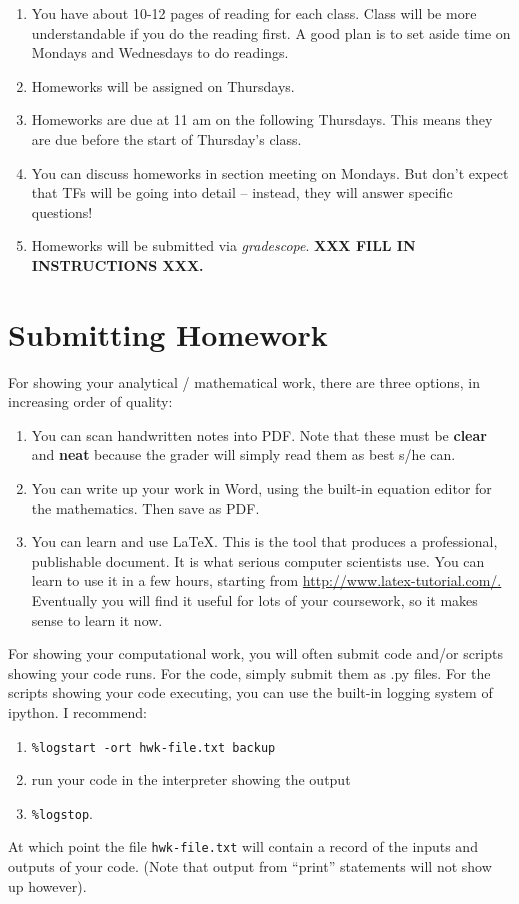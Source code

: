 \documentclass[11pt]{article}
\begin{document}
\begin{enumerate}
\item  You have about 10-12 pages of reading for each class.   Class will be
more understandable if you do the reading first.   A good plan is to set aside
time on Mondays and Wednesdays to do readings.
\item  Homeworks will be assigned on Thursdays.
\item Homeworks are due at 11 am on the following Thursdays.  This means
  they are due 
before the start of Thursday's class.
\item You can discuss homeworks in section meeting on Mondays.   But don't
expect that TFs will be going into detail -- instead, they will
answer specific questions!
\item Homeworks will be submitted via \emph{gradescope}.  \textbf{XXX FILL IN
  INSTRUCTIONS XXX.}
\end{enumerate}

\section*{Submitting Homework}
For showing your analytical / mathematical work, there are three
options, in increasing order of quality:
\begin{enumerate}
\item You can scan handwritten notes into PDF.    Note that these must
  be \textbf{clear} and \textbf{neat} because the grader will simply
  read them as best s/he can.
\item You can write up your work in Word, using the built-in equation
  editor for the mathematics.   Then save as PDF.   
\item You can learn and use \LaTeX.   This is the tool that produces a
  professional, publishable document.   It is what serious
  computer scientists use.  You can learn to use it in a few hours,
  starting from \url{http://www.latex-tutorial.com/.}   Eventually you will
  find it useful for lots of your coursework, so it makes sense to learn it
  now. 
\end{enumerate}

For showing your computational work, you will often submit code 
and/or scripts showing your code runs.   For the code, simply
submit them as .py files.   For the scripts showing your code executing,
you can use the built-in logging system of ipython.   I recommend: 
\begin{enumerate}
\item \verb$%logstart -ort hwk-file.txt backup$
\item run your code in the interpreter showing the output
\item \verb$%logstop$.
\end{enumerate}
At which point the file \texttt{hwk-file.txt} will contain a record of
the inputs and outputs of your code.   (Note that output from ``print'' statements
will not show up however). 
\end{document}
